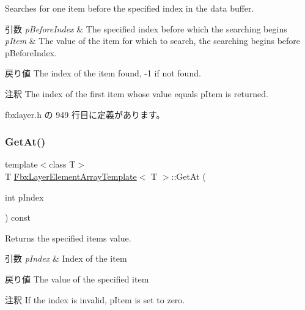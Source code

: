 Searches for one item before the specified index in the data buffer. 
\begin{DoxyParams}{引数}
{\em p\+Before\+Index} & The specified index before which the searching begins \\
\hline
{\em p\+Item} & The value of the item for which to search, the searching begins before p\+Before\+Index. \\
\hline
\end{DoxyParams}
\begin{DoxyReturn}{戻り値}
The index of the item found, -\/1 if not found. 
\end{DoxyReturn}
\begin{DoxyRemark}{注釈}
The index of the first item whose value equals p\+Item is returned. 
\end{DoxyRemark}


 fbxlayer.\+h の 949 行目に定義があります。

\mbox{\label{class_fbx_layer_element_array_template_a68180d4ec375c231a49ce117503a1aa8}} 
\subsubsection{\texorpdfstring{Get\+At()}{GetAt()}}
{\footnotesize\ttfamily template$<$class T$>$ \\
T \hyperlink{class_fbx_layer_element_array_template}{Fbx\+Layer\+Element\+Array\+Template}$<$ T $>$\+::Get\+At (\begin{DoxyParamCaption}\item[{int}]{p\+Index }\end{DoxyParamCaption}) const\hspace{0.3cm}{\ttfamily [inline]}}

Returns the specified item\textquotesingle{}s value. 
\begin{DoxyParams}{引数}
{\em p\+Index} & Index of the item \\
\hline
\end{DoxyParams}
\begin{DoxyReturn}{戻り値}
The value of the specified item 
\end{DoxyReturn}
\begin{DoxyRemark}{注釈}
If the index is invalid, p\+Item is set to zero. 
\end{DoxyRemark}


